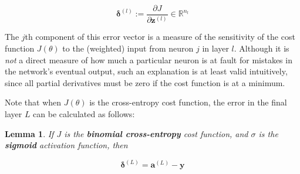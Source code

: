 \documentclass{article}[11pt]
\newtheorem{lemma}{Lemma}
\begin{document}
        $$
        \mathbf{\delta}^{(l)} :=  \frac{\partial J}{\partial \mathbf{z}^{(l)}} \in \mathbb{R}^{n_l}
        $$
        
        The $j$th component of this error vector is a measure of the sensitivity of the cost function $J(\theta)$ to the (weighted) input from neuron $j$ in layer $l$. Although it is \textit{not} a direct measure of how much a particular neuron is at fault for mistakes in the network's eventual output, such an explanation is at least valid intuitively, since all partial derivatives must be zero if the cost function is at a minimum.
        
        Note that when $J(\theta)$ is the cross-entropy cost function, the error in the final layer $L$ can be calculated as follows:
        
        \begin{lemma}
            
            If $J$ is the \textbf{binomial cross-entropy} cost function, and $\sigma$ is the \textbf{sigmoid} activation function, then
            
            $$
            \boldsymbol{\delta}^{(L)} = \mathbf{a}^{(L)} - \mathbf{y}
            $$
            
        \end{lemma}
        
\end{document}
